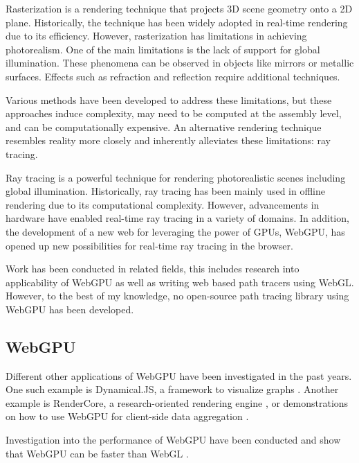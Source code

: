 Rasterization is a rendering technique that projects 3D scene geometry onto a 2D plane. Historically, the technique has been widely adopted in real-time rendering due to its efficiency. However, rasterization has limitations in achieving photorealism. One of the main limitations is the lack of support for global illumination. These phenomena can be observed in objects like mirrors or metallic surfaces. Effects such as refraction and reflection require additional techniques.

Various methods have been developed to address these limitations, but these approaches induce complexity, may need to be computed at the assembly level, and can be computationally expensive. An alternative rendering technique resembles reality more closely and inherently alleviates these limitations: ray tracing.

Ray tracing is a powerful technique for rendering photorealistic scenes including global illumination. Historically, ray tracing has been mainly used in offline rendering due to its computational complexity. However, advancements in hardware have enabled real-time ray tracing in a variety of domains. In addition, the development of a new web  for leveraging the power of \glspl{GPU}, WebGPU, has opened up new possibilities for real-time ray tracing in the browser.

Work has been conducted in related fields, this includes research into applicability of WebGPU as well as writing web based path tracers using WebGL. However, to the best of my knowledge, no open-source path tracing library using WebGPU has been developed.

\subsection*{WebGPU}

Different other applications of WebGPU have been investigated in the past years. One such example is Dynamical.JS, a framework to visualize graphs \cite{dotson2022dynamicaljs}. Another example is RenderCore, a research-oriented rendering engine \cite{Bohak_Kovalskyi_Linev_Mrak_Tadel_Strban_Tadel_Yagil_2024}, or demonstrations on how to use WebGPU for client-side data aggregation \cite{kimmersdorfer2023webgpu}.

Investigation into the performance of WebGPU have been conducted and show that WebGPU can be faster than WebGL \cite{webGPUWebGis, fransson2023performance, CHICKERUR2024919}.
 

